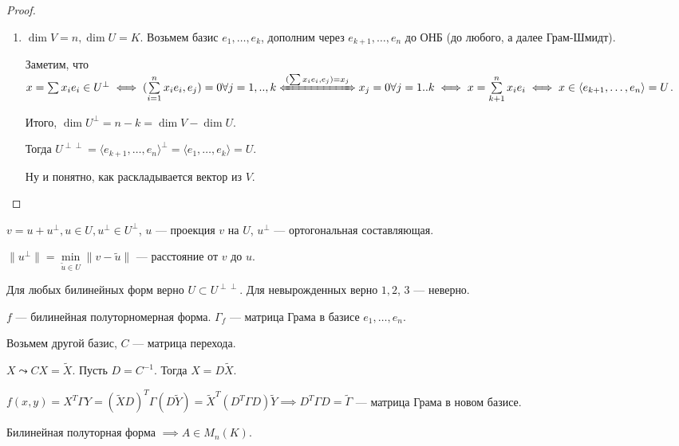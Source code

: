  \begin{proof}
     \slashn
     \begin{enumerate}
         \item $\dim V = n, \dim U = K$. Возьмем базис $e_1, \ldots, e_k$, дополним через $e_{k+1}, \ldots, e_n$ до ОНБ (до любого, а далее Грам-Шмидт).

             Заметим, что $x = \sum x_ie_i \in U^{\perp} \iff (\sum\limits_{i=1}^n x_ie_i, e_j) = 0 \forall j=1,..,k \xLeftrightarrow{(\sum x_i e_i, e_j) = x_j} x_j = 0 \forall j=1..k \iff x = \sum\limits_{k+1}^n x_ie_i \iff x \in \langle e_{k+1}, \ldots, e_n \rangle = U$.

            Итого, $\dim U^\perp = n - k = \dim V - \dim U$.

            Тогда  $U^{\perp\perp} = \langle e_{k+1}, \ldots, e_n \rangle ^{\perp} = \langle e_1, \ldots, e_k \rangle = U$. 

            Ну и понятно, как раскладывается вектор из $V$.
     \end{enumerate}
 \end{proof}
 \begin{definition}
     $v = u+u^{\perp}, u \in U, u^{\perp} \in U^{\perp}$,  $u$ --- проекция  $v$ на  $U$, $u^\perp$ --- ортогональная составляющая.

     $\|u^{\perp}\| = \min\limits_{\widetilde{u} \in U} \|v - \widetilde{u}\|$ --- расстояние от $v$ до  $u$.
 \end{definition}
\begin{remark}
     Для любых билинейных форм верно $U \subset U^{\perp\perp}$. Для невырожденных верно $1, 2$,  $3$ --- неверно.
 \end{remark}
 \begin{statement}
     $f$ --- билинейная полуторномерная форма.  $\Gamma_f$ --- матрица Грама в базисе  $e_1, \ldots, e_n$.

     Возьмем другой базис, $C$ --- матрица перехода.

     $X \leadsto C X = \widetilde{X}$. Пусть  $D = C^{-1}$. Тогда  $X = D\widetilde{X}$.

     $f(x, y) = X^T\Gamma Y = (\widetilde{X}D)^T\Gamma (D\widetilde{Y})= \widetilde{X}^{T} (D^T\Gamma D)\widetilde{Y} \implies D^T\Gamma D = \widetilde{\Gamma}$ --- матрица Грама в новом базисе.
 \end{statement}

 Билинейная полуторная форма $\implies A \in M_n(K)$.

